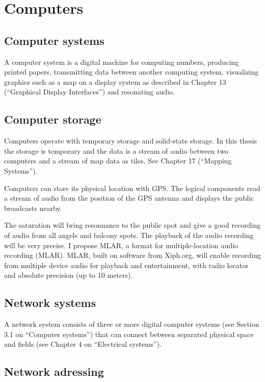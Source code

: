 \documentclass[a4paper,norsk,utf8]{report}
\begin{document}
\part{Computers}

\chapter{Computer systems}

    A computer system is a digital machine for computing numbers, producing
    printed papers, transmitting data between another computing system,
    visualizing graphics such as a map on a display system as described
    in Chapter 13 (``Graphical Display Interfaces'') and resonating audio.

\chapter{Computer storage}

    Computers operate with temporary storage and solid-state storage.
    In this thesis the storage is temporary and the data is a stream of
    audio between two computers and a stream of map data as tiles.
    See Chapter 17 (``Mapping Systems'').

    Computers can store its physical location with GPS.  The logical
    components read a stream of audio from the position of the GPS
    antenna and displays the public broadcasts nearby.

    The saturation will bring resonnance to the public spot and give
    a good recording of audio from all angels and balcony spots.
    The playback of the audio recording will be very precise.
    I propose MLAR, a format for multiple-location audio recording
    (MLAR).  MLAR, built on software from Xiph.org, will enable recording
    from multiple device audio for playback and entertainment, with radio
    locator and absolute precision (up to 10 meters).

\chapter{Network systems}

    A network system consists of three or more digital computer
    systems (see Section 3.1 on ``Computer systems'') that can connect
    between separated physical space and fields (see Chapter 4 on
    ``Electrical systems'').

\chapter{Network adressing}
\end{document}
